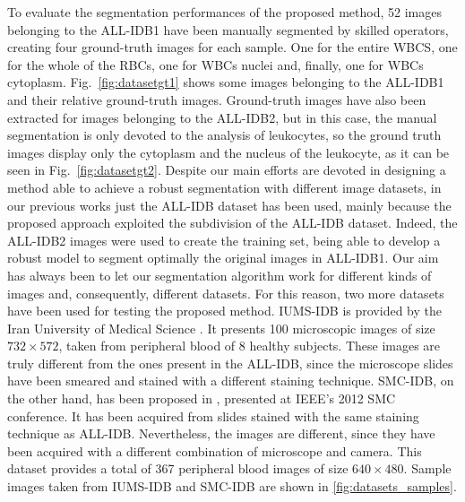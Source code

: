 \documentclass[final,a4paper,12pt,english]{UnicaPhdThesis3}
\begin{document}
To evaluate the segmentation performances of the proposed method, 52 images belonging to the ALL-IDB1 have been manually segmented by skilled operators, creating four ground-truth images for each sample. One for the entire WBCS, one for the whole of the RBCs, one for WBCs nuclei and, finally, one for WBCs cytoplasm. Fig.~\ref{fig:datasetgt1} shows some images belonging to the ALL-IDB1 and their relative ground-truth images. Ground-truth images have also been extracted for images belonging to the ALL-IDB2, but in this case, the manual segmentation is only devoted to the analysis of leukocytes, so the ground truth images display only the cytoplasm and the nucleus of the leukocyte, as it can be seen in Fig.~\ref{fig:datasetgt2}.
Despite our main efforts are devoted in designing a method able to achieve a robust segmentation with different image datasets, in our previous works \cite{Put15c, Put15d}  just the ALL-IDB dataset has been used, mainly because the proposed approach exploited the subdivision of the ALL-IDB dataset. Indeed, the ALL-IDB2 images were used to create the training set, being able to develop a robust model to segment optimally the original images in ALL-IDB1. Our aim has always been to let our segmentation algorithm work for different kinds of images and, consequently, different datasets. 
For this reason, two more datasets have been used for testing the proposed method. 
IUMS-IDB is provided by the Iran University of Medical Science \cite{Sarrafzadeh}. It presents 100 microscopic images of size $732 \times 572$, taken from peripheral blood of 8 healthy subjects. These images are truly different from the ones present in the ALL-IDB, since the microscope slides have been smeared and stained with a different staining technique. SMC-IDB, on the other hand, has been proposed in \cite{Mohamed}, presented at IEEE's 2012 SMC conference. It has been acquired from slides stained with the same staining technique as ALL-IDB. Nevertheless, the images are different, since they have been acquired with a different combination of microscope and camera. This dataset provides a total of 367 peripheral blood images of size $640 \times 480$.
Sample images taken from IUMS-IDB and SMC-IDB are shown in \ref{fig:datasets_samples}.
\end{document}

